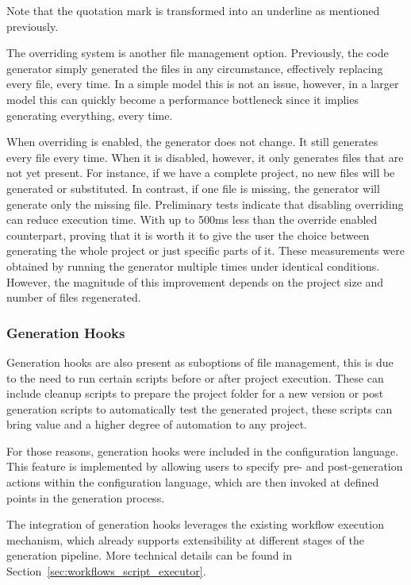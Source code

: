 Note that the quotation mark is transformed into an underline as mentioned previously.

The overriding system is another file management option. Previously, the code generator simply generated the files in any circumstance, effectively replacing every file, every time. In a simple model this is not an issue, however, in a larger model this can quickly become a performance bottleneck since it implies generating everything, every time. 

When overriding is enabled, the generator does not change. It still generates every file every time. When it is disabled, however, it only generates files that are not yet present. For instance, if we have a complete project, no new files will be generated or substituted. In contrast, if one file is missing, the generator will generate only the missing file. Preliminary tests indicate that disabling overriding can reduce execution time. With up to 500ms less than the override enabled counterpart, proving that it is worth it to give the user the choice between generating the whole project or just specific parts of it. These measurements were obtained by running the generator multiple times under identical conditions. However, the magnitude of this improvement depends on the project size and number of files regenerated.


\subsubsection{Generation Hooks}
\label{sec:impl_gen_hooks}

Generation hooks are also present as suboptions of file management, this is due to the need to run certain scripts before or after project execution. These can include cleanup scripts to prepare the project folder for a new version or post generation scripts to automatically test the generated project, these scripts can bring value and a higher degree of automation to any project.

For those reasons, generation hooks were included in the configuration language. This feature is implemented by allowing users to specify pre- and post-generation actions within the configuration language, which are then invoked at defined points in the generation process.

The integration of generation hooks leverages the existing workflow execution mechanism, which already supports extensibility at different stages of the generation pipeline. More technical details can be found in Section~\ref{sec:workflows_script_executor}.


